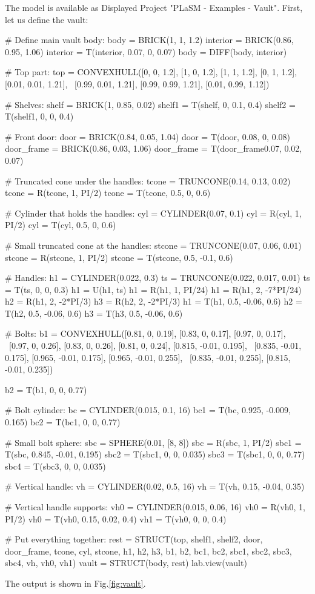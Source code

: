 The model is available as Displayed Project "PLaSM - Examples - Vault". First, let us 
define the vault:

{\small
\begin{bluecode}
# Define main vault body:
body = BRICK(1, 1, 1.2)
interior = BRICK(0.86, 0.95, 1.06)
interior = T(interior, 0.07, 0, 0.07)
body = DIFF(body, interior)

# Top part:
top = CONVEXHULL([0, 0, 1.2], [1, 0, 1.2], [1, 1, 1.2], [0, 1, 1.2], [0.01, 0.01, 1.21], \
                 [0.99, 0.01, 1.21], [0.99, 0.99, 1.21], [0.01, 0.99, 1.12])

# Shelves:
shelf = BRICK(1, 0.85, 0.02)
shelf1 = T(shelf, 0, 0.1, 0.4)
shelf2 = T(shelf1, 0, 0, 0.4)

# Front door:
door = BRICK(0.84, 0.05, 1.04)
door = T(door, 0.08, 0, 0.08)
door_frame = BRICK(0.86, 0.03, 1.06)
door_frame = T(door_frame0.07, 0.02, 0.07)

# Truncated cone under the handles:
tcone = TRUNCONE(0.14, 0.13, 0.02)
tcone = R(tcone, 1, PI/2)
tcone = T(tcone, 0.5, 0, 0.6)

# Cylinder that holds the handles:
cyl = CYLINDER(0.07, 0.1)
cyl = R(cyl, 1, PI/2)
cyl = T(cyl, 0.5, 0, 0.6)

# Small truncated cone at the handles:
stcone = TRUNCONE(0.07, 0.06, 0.01)
stcone = R(stcone, 1, PI/2)
stcone = T(stcone, 0.5, -0.1, 0.6)

# Handles:
h1 = CYLINDER(0.022, 0.3)
ts = TRUNCONE(0.022, 0.017, 0.01)
ts = T(ts, 0, 0, 0.3)
h1 = U(h1, ts)
h1 = R(h1, 1, PI/24)
h1 = R(h1, 2, -7*PI/24)
h2 = R(h1, 2, -2*PI/3)
h3 = R(h2, 2, -2*PI/3)
h1 = T(h1, 0.5, -0.06, 0.6)
h2 = T(h2, 0.5, -0.06, 0.6)
h3 = T(h3, 0.5, -0.06, 0.6)

# Bolts:
b1 = CONVEXHULL([0.81, 0, 0.19], [0.83, 0, 0.17], [0.97, 0, 0.17], \ 
[0.97, 0, 0.26], [0.83, 0, 0.26], [0.81, 0, 0.24], [0.815, -0.01, 0.195], \
[0.835, -0.01, 0.175], [0.965, -0.01, 0.175], [0.965, -0.01, 0.255], \
[0.835, -0.01, 0.255], [0.815, -0.01, 0.235])

b2 = T(b1, 0, 0, 0.77)

# Bolt cylinder:
bc = CYLINDER(0.015, 0.1, 16)
bc1 = T(bc, 0.925, -0.009, 0.165)
bc2 = T(bc1, 0, 0, 0.77)

# Small bolt sphere:
sbc = SPHERE(0.01, [8, 8])
sbc = R(sbc, 1, PI/2)
sbc1 = T(sbc, 0.845, -0.01, 0.195)
sbc2 = T(sbc1, 0, 0, 0.035)
sbc3 = T(sbc1, 0, 0, 0.77)
sbc4 = T(sbc3, 0, 0, 0.035)

# Vertical handle:
vh = CYLINDER(0.02, 0.5, 16)
vh = T(vh, 0.15, -0.04, 0.35)

# Vertical handle supports:
vh0 = CYLINDER(0.015, 0.06, 16)
vh0 = R(vh0, 1, PI/2)
vh0 = T(vh0, 0.15, 0.02, 0.4)
vh1 = T(vh0, 0, 0, 0.4)

# Put everything together:
rest = STRUCT(top, shelf1, shelf2, door, door_frame, tcone, cyl, stcone, 
              h1, h2, h3, b1, b2, bc1, bc2, sbc1, sbc2, sbc3, sbc4, vh, vh0, vh1)
vault = STRUCT(body, rest)
lab.view(vault)
\end{bluecode}
}
\index{ROTATE}
\index{CYLINDER}
\index{UNION}
\noindent
The output is shown in Fig.\ref{fig:vault}.

